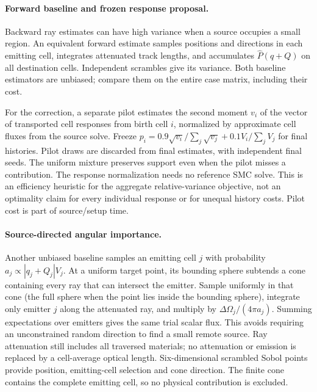 \documentclass[11pt]{article}
\begin{document}
\paragraph{Forward baseline and frozen response proposal.}
Backward ray estimates can have high variance when a source occupies a small
region. An equivalent forward estimate samples positions and directions in
each emitting cell, integrates attenuated track lengths, and accumulates
$\widehat P(q+Q)$ on all destination cells. Independent scrambles give its
variance. Both baseline estimators are unbiased; compare them on the entire
case matrix, including their cost.

For the correction, a separate pilot estimates the second moment $v_i$ of
the vector of transported cell responses from birth cell $i$, normalized by
approximate cell fluxes from the source solve. Freeze
$p_i=0.9\sqrt{v_i}/\sum_j\sqrt{v_j}+0.1V_i/\sum_jV_j$ for final histories.
Pilot draws are discarded from final estimates, with independent final seeds.
The uniform mixture preserves support even when the pilot misses a contribution.
The response normalization needs no reference SMC solve. This is an efficiency
heuristic for the aggregate relative-variance objective, not an optimality claim
for every individual response or for unequal history costs. Pilot cost is part
of source/setup time.

\paragraph{Source-directed angular importance.}
Another unbiased baseline samples an emitting cell $j$ with probability
$a_j\propto |q_j+Q_j|V_j$. At a uniform target point, its bounding sphere
subtends a cone containing every ray that can intersect the emitter. Sample
uniformly in that cone (the full sphere when the point lies inside the bounding
sphere), integrate only emitter $j$ along the attenuated ray, and multiply by
$\Delta\Omega_j/(4\pi a_j)$. Summing expectations over emitters gives the same
trial scalar flux. This avoids requiring an unconstrained random direction to
find a small remote source. Ray attenuation still includes all traversed
materials; no attenuation or emission is replaced by a cell-average optical
length. Six-dimensional scrambled Sobol points provide position, emitting-cell
selection and cone direction. The finite cone contains the complete emitting
cell, so no physical contribution is excluded.
\end{document}
